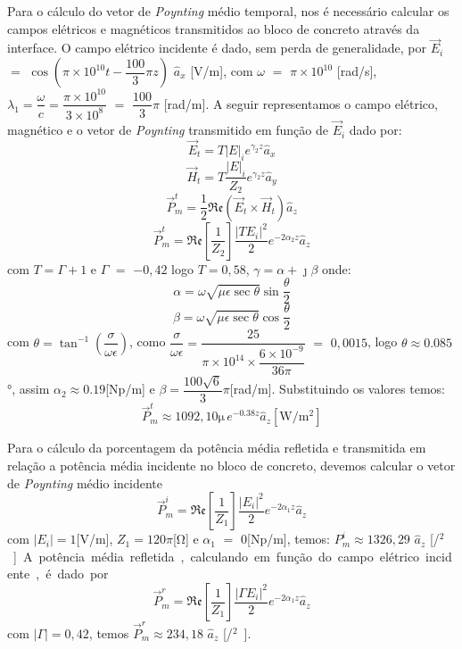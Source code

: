 \begin{enumerate}[1.]
Para o cálculo do vetor de \emph{Poynting} médio temporal, nos é necessário calcular os campos elétricos e magnéticos transmitidos ao bloco de concreto através da interface.  O campo elétrico incidente é dado, sem perda de generalidade, por $\vec{E}_{i}$ $=$ $\cos(\pi \times 10^{10} t - \dfrac{100}{3}\pi z)$ $\hat{a}_{x}$ [\si{\volt/\meter}], com $\omega$ $=$ $\pi \times 10^{10}$ [\si{\radian/\second}], $\lambda_{1} = \dfrac{\omega}{c} = \dfrac{\pi \times 10^{10}}{3 \times 10^{8}}$ $=$ $\dfrac{100}{3}\pi$ [\si{\radian/\meter}]. A seguir representamos o  campo elétrico, magnético e o vetor de \emph{Poynting} transmitido em função de $\vec{E}_{i}$ dado por: $$\vec{E}_{t}  =  T |E|_{i} e^{\gamma_{2} z} \hat{a}_{x}$$ $$\vec{H}_{t}  =  T \dfrac{|E|_{i}}{Z_{2}} e^{\gamma_{2} z} \hat{a}_{y}$$ $$\vec{P}_{m}^{t} = \dfrac{1}{2}\mathfrak{Re}(\vec{E}_{t} \times \vec{H}_{t}) \hat{a}_{z}$$ $$\vec{P}_{m}^{t} = \mathfrak{Re}\left[\dfrac{1}{Z_{2}}\right] \dfrac{|T E_{i}|^2}{2}e^{-2\alpha_{2} z} \hat{a}_{z}$$ com $T = \Gamma + 1$ e $\Gamma$ $=$ $-0,42$ logo $T = 0,58$, $\gamma = \alpha + \jmath \beta$  onde: $$\alpha = \omega \sqrt{\mu\epsilon \sec{\theta}} \sin{\dfrac{\theta}{2}}$$ $$\beta = \omega \sqrt{\mu\epsilon \sec{\theta}} \cos{\dfrac{\theta}{2}}$$ com $\theta = \tan^{-1}\left(\dfrac{\sigma}{\omega\epsilon}\right)$, como $\dfrac{\sigma}{\omega\epsilon} = \dfrac{25}{\pi \times 10^{14} \times \dfrac{6 \times 10^{-9}}{36\pi}}$ $=$ $0,0015$, logo $\theta \approx 0.085$\si{\degree}, assim $\alpha_{2} \approx 0.19$[\si{\neper/\meter}] e $\beta = \dfrac{100\sqrt{6}}{3}\pi$[\si{\radian/\meter}]. Substituindo os valores temos: $$\vec{P}_{m}^{t} \approx 1092,10 \si{\micro} \, e^{-0.38 z} \hat{a}_{z}[\si{\watt/\meter^{2}}]$$

Para o cálculo da porcentagem da potência média refletida e transmitida em relação a potência média incidente no bloco de concreto, devemos calcular o vetor de \emph{Poynting} médio incidente $$\vec{P}_{m}^{i} = \mathfrak{Re}\left[\dfrac{1}{Z_{1}}\right] \dfrac{|E_{i}|^2}{2}e^{-2\alpha_{1} z} \hat{a}_{z}$$ com $|E_i| = 1$[\si{\volt/\meter}], $Z_{1} = 120\pi$[\si{\ohm}] e $\alpha_{1}$ $=$ $0$[\si{\neper/\meter}], temos: $P_{m}^{i} \approx 1326,29$\si{\micro} $\hat{a}_{z}$ [\si{\watt/\meter$^2$}]. A potência média refletida, calculando em função do campo elétrico incidente, é dado por $$\vec{P}_{m}^{r} = \mathfrak{Re}\left[\dfrac{1}{Z_{1}}\right] \dfrac{|\Gamma E_{i}|^2}{2}e^{-2\alpha_{1} z} \hat{a}_{z}$$ com $|\Gamma| = 0,42$, temos $\vec{P}_{m}^{r} \approx 234,18$\si{\micro} $\hat{a}_{z}$ [\si{\watt/\meter$^2$}].


\end{enumerate}
